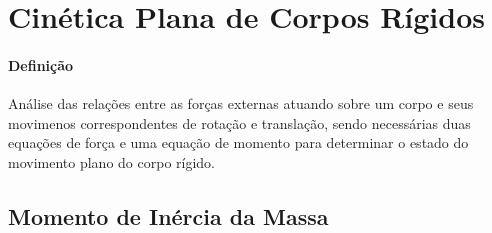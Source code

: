 \documentclass{article}
\begin{document}
    \section{Cinética Plana de Corpos Rígidos}
        \paragraph{Definição}Análise das relações entre as forças externas atuando sobre um corpo e seus movimenos correspondentes de rotação e translação, sendo necessárias duas equações de força e uma equação de momento para determinar o estado do movimento plano do corpo rígido.

        \subsection{Momento de Inércia da Massa}
\end{document}
